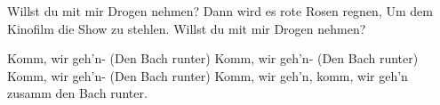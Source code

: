 \begin{guitar}
	Willst du mit mir Drogen nehmen?
	Dann wird es rote Rosen regnen,
	Um dem Kinofilm die Show zu stehlen.
	Willst du mit mir Drogen nehmen?
	
	 
	
	Komm, wir geh'n- (Den Bach runter)
	Komm, wir geh'n- (Den Bach runter)
	Komm, wir geh'n- (Den Bach runter)
	Komm, wir geh'n, komm, wir geh'n zusamm den Bach runter.
\end{guitar}

